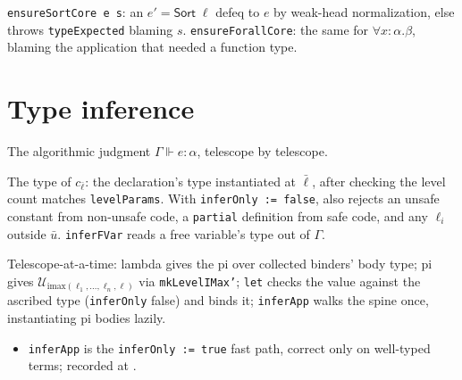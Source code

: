 \begin{definition}
\label{def:kernel-ensure-sort-forall}
\leanok
{}

 \texttt{ensureSortCore e s}: an $e' = \mathsf{Sort}\;\ell$ defeq to $e$ by
weak-head normalization, else throws \texttt{typeExpected} blaming $s$.
\texttt{ensureForallCore}: the same for $\forall x:\alpha.\beta$, blaming the application that
needed a function type.
\end{definition}

\section{Type inference}

The algorithmic judgment $\Gamma \Vdash e:\alpha$, telescope by telescope.

\begin{definition}
\label{def:kernel-infer-constant}
\leanok
{}

 The type of $c_{\bar\ell}$: the declaration's type instantiated at $\bar\ell$,
after checking the level count matches \texttt{levelParams}.
With \texttt{inferOnly := false}, also rejects an unsafe constant from non-unsafe code, a
\texttt{partial} definition from safe code, and any $\ell_i$ outside $\bar u$. \texttt{inferFVar}
reads a free variable's type out of $\Gamma$.
\end{definition}

\begin{definition}
\label{def:kernel-infer-binders}
\leanok
{}

 Telescope-at-a-time: lambda gives the pi over collected binders' body type; pi
gives $\mathcal{U}_{\mathrm{imax}(\ell_1,\dots,\ell_n,\ell)}$ via \texttt{mkLevelIMax'};
\texttt{let} checks the value against the ascribed type (\texttt{inferOnly} false) and binds it;
\texttt{inferApp} walks the spine once, instantiating pi bodies lazily.
\begin{itemize}
\item {} \texttt{inferApp} is the \texttt{inferOnly := true} fast path, correct only on
well-typed terms; recorded at .
\end{itemize}
\end{definition}

